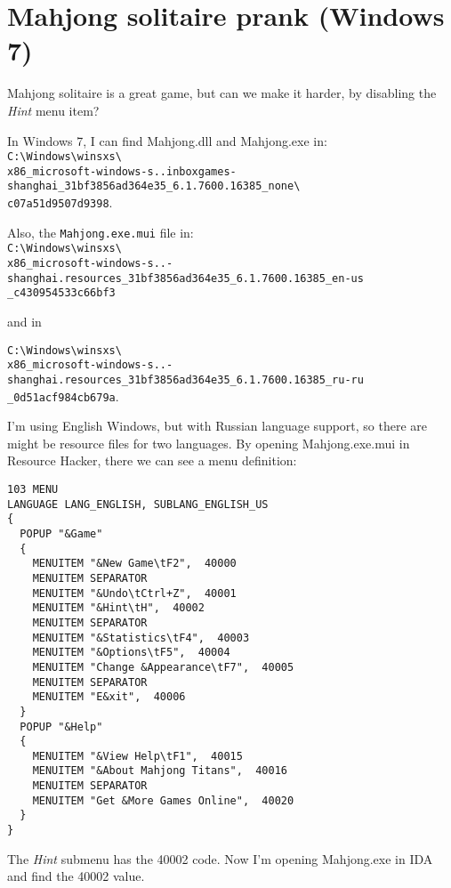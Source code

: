 ﻿\section{Mahjong solitaire prank (Windows 7)}

Mahjong solitaire is a great game, but can we make it harder, by disabling the \emph{Hint} menu item?

In Windows 7, I can find Mahjong.dll and Mahjong.exe in:\\
\verb|C:\Windows\winsxs\| \\
\verb|x86_microsoft-windows-s..inboxgames-shanghai_31bf3856ad364e35_6.1.7600.16385_none\| \\
\verb|c07a51d9507d9398|.

Also, the \verb|Mahjong.exe.mui| file in:\\
\verb|C:\Windows\winsxs\| \\
\verb|x86_microsoft-windows-s..-shanghai.resources_31bf3856ad364e35_6.1.7600.16385_en-us| \\
\verb|_c430954533c66bf3|

and in

\verb|C:\Windows\winsxs\| \\
\verb|x86_microsoft-windows-s..-shanghai.resources_31bf3856ad364e35_6.1.7600.16385_ru-ru| \\
\verb|_0d51acf984cb679a|.

I'm using English Windows, but with Russian language support, so there are might be resource files for two languages.
By opening Mahjong.exe.mui in Resource Hacker, there we can see a menu definition:

\begin{lstlisting}[caption=Menu resources in Mahjong.exe.mui]
103 MENU
LANGUAGE LANG_ENGLISH, SUBLANG_ENGLISH_US
{
  POPUP "&Game"
  {
    MENUITEM "&New Game\tF2",  40000
    MENUITEM SEPARATOR
    MENUITEM "&Undo\tCtrl+Z",  40001
    MENUITEM "&Hint\tH",  40002
    MENUITEM SEPARATOR
    MENUITEM "&Statistics\tF4",  40003
    MENUITEM "&Options\tF5",  40004
    MENUITEM "Change &Appearance\tF7",  40005
    MENUITEM SEPARATOR
    MENUITEM "E&xit",  40006
  }
  POPUP "&Help"
  {
    MENUITEM "&View Help\tF1",  40015
    MENUITEM "&About Mahjong Titans",  40016
    MENUITEM SEPARATOR
    MENUITEM "Get &More Games Online",  40020
  }
}
\end{lstlisting}

The \emph{Hint} submenu has the 40002 code.
Now I'm opening Mahjong.exe in IDA and find the 40002 value.

